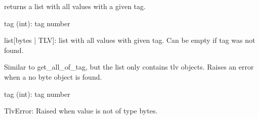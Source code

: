 \documentclass[letterpaper,10pt,english]{sphinxmanual}
\begin{document}
\begin{fulllineitems}

\begin{fulllineitems}
\label{\detokenize{aliro_actuator.access_protocol.tlv:aliro_actuator.access_protocol.tlv.TLV.get_all_of_tag}}
\pysigstartsignatures
{}
\pysigstopsignatures
\sphinxAtStartPar
returns a list with all values with a given tag.
\begin{description}
\sphinxAtStartPar
tag (int): tag number

\sphinxAtStartPar
list{[}bytes | TLV{]}: list with all values with given tag.
Can be empty if tag was not found.

\end{description}

\end{fulllineitems}


\begin{fulllineitems}
\label{\detokenize{aliro_actuator.access_protocol.tlv:aliro_actuator.access_protocol.tlv.TLV.get_all_tlv_of_tag}}
\pysigstartsignatures
{}
\pysigstopsignatures
\sphinxAtStartPar
Similar to get\_all\_of\_tag, but the list only contains tlv objects.
Raises an error when a no byte object is found.
\begin{description}
\sphinxAtStartPar
tag (int): tag number

\sphinxAtStartPar
TlvError: Raised when value is not of type bytes.


\end{description}
\end{fulllineitems}
\end{fulllineitems}
\end{document}
